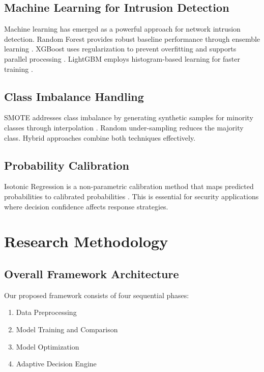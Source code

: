 \documentclass[conference]{IEEEtran}
\begin{document}
\subsection{Machine Learning for Intrusion Detection}

Machine learning has emerged as a powerful approach for network intrusion detection. Random Forest provides robust baseline performance through ensemble learning \cite{random_forest}. XGBoost uses regularization to prevent overfitting and supports parallel processing \cite{xgboost}. LightGBM employs histogram-based learning for faster training \cite{lightgbm}.

\subsection{Class Imbalance Handling}

SMOTE addresses class imbalance by generating synthetic samples for minority classes through interpolation \cite{smote}. Random under-sampling reduces the majority class. Hybrid approaches combine both techniques effectively.

\subsection{Probability Calibration}

Isotonic Regression is a non-parametric calibration method that maps predicted probabilities to calibrated probabilities \cite{isotonic_calibration}. This is essential for security applications where decision confidence affects response strategies.

\section{Research Methodology}

\subsection{Overall Framework Architecture}

Our proposed framework consists of four sequential phases:

\begin{enumerate}
\item Data Preprocessing
\item Model Training and Comparison
\item Model Optimization
\item Adaptive Decision Engine
\end{enumerate}
\end{document}
